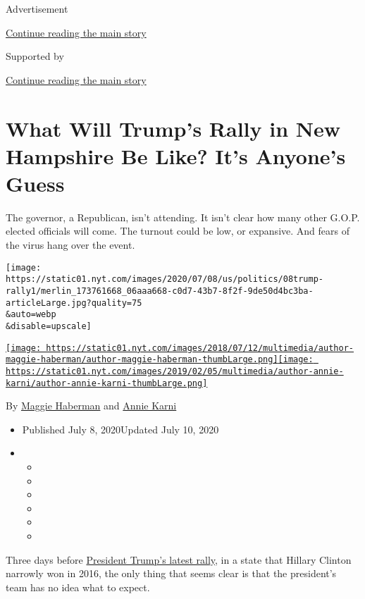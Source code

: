 Advertisement

\protect\hyperlink{after-top}{Continue reading the main story}

Supported by

\protect\hyperlink{after-sponsor}{Continue reading the main story}

\hypertarget{what-will-trumps-rally-in-new-hampshire-be-like-its-anyones-guess}{%
\section{What Will Trump's Rally in New Hampshire Be Like? It's Anyone's
Guess}\label{what-will-trumps-rally-in-new-hampshire-be-like-its-anyones-guess}}

The governor, a Republican, isn't attending. It isn't clear how many
other G.O.P. elected officials will come. The turnout could be low, or
expansive. And fears of the virus hang over the event.

\texttt{[image: https://static01.nyt.com/images/2020/07/08/us/politics/08trump-rally1/merlin\_173761668\_06aaa668-c0d7-43b7-8f2f-9de50d4bc3ba-articleLarge.jpg?quality=75\\\&auto=webp\\\&disable=upscale]}

\href{https://www.nytimes.com/by/maggie-haberman}{\texttt{[image: https://static01.nyt.com/images/2018/07/12/multimedia/author-maggie-haberman/author-maggie-haberman-thumbLarge.png]}}\href{https://www.nytimes.com/by/annie-karni}{\texttt{[image: https://static01.nyt.com/images/2019/02/05/multimedia/author-annie-karni/author-annie-karni-thumbLarge.png]}}

By \href{https://www.nytimes.com/by/maggie-haberman}{Maggie Haberman}
and \href{https://www.nytimes.com/by/annie-karni}{Annie Karni}

\begin{itemize}
\item
  Published July 8, 2020Updated July 10, 2020
\item
  \begin{itemize}
  \item
  \item
  \item
  \item
  \item
  \item
  \end{itemize}
\end{itemize}

Three days before
\href{https://www.nytimes.com/2020/07/10/us/politics/trump-nh-rally-postponed.html}{President
Trump's latest rally}, in a state that Hillary Clinton narrowly won in
2016, the only thing that seems clear is that the president's team has
no idea what to expect.

